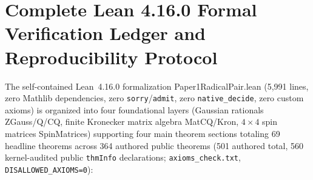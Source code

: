 \documentclass[onecolumn,10pt,notitlepage,amsmath,amssymb,floatfix]{revtex4-2}
\theoremstyle{plain}
\theoremstyle{definition}
\newcommand{\leanid}[1]{{\footnotesize\ttfamily\def\_{\textunderscore\allowbreak}#1}}
\begin{document}
\section{Complete Lean 4.16.0 Formal Verification Ledger and Reproducibility Protocol}
\label{sec:S6}

The self-contained Lean~4.16.0 formalization \leanid{Paper1\_RadicalPair.lean} (5,991 lines, zero Mathlib dependencies, zero \texttt{sorry}/\texttt{admit}, zero \texttt{native\_decide}, zero custom axioms) is organized into four foundational layers (Gaussian rationals \leanid{ZGauss}/\leanid{Q}/\leanid{CQ}, finite Kronecker matrix algebra \leanid{MatCQ}/\leanid{Kron}, $4\times 4$ spin matrices \leanid{SpinMatrices}) supporting four main theorem sections totaling 69 headline theorems across 364 authored public theorems (501 authored total, 560 kernel-audited public \texttt{thmInfo} declarations; \texttt{axioms\_check.txt}, \texttt{DISALLOWED\_AXIOMS=0}):
\end{document}
